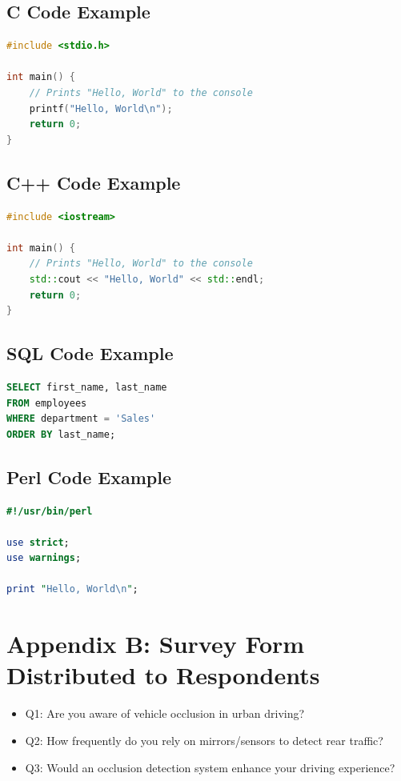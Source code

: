 \documentclass[12pt,a4paper]{report}
\theoremstyle{definition}
\theoremstyle{remark}
\begin{document}
\section{C Code Example}
\begin{lstlisting}[language=C, caption=C Example]
#include <stdio.h>

int main() {
    // Prints "Hello, World" to the console
    printf("Hello, World\n");
    return 0;
}
\end{lstlisting}

\section{C++ Code Example}
\begin{lstlisting}[language=C++, caption=C++ Example]
#include <iostream>

int main() {
    // Prints "Hello, World" to the console
    std::cout << "Hello, World" << std::endl;
    return 0;
}
\end{lstlisting}

\section{SQL Code Example}
\begin{lstlisting}[language=SQL, caption=SQL Example]
SELECT first_name, last_name
FROM employees
WHERE department = 'Sales'
ORDER BY last_name;
\end{lstlisting}

\section{Perl Code Example}
\begin{lstlisting}[language=Perl, caption=Perl Example]
#!/usr/bin/perl

use strict;
use warnings;

print "Hello, World\n";
\end{lstlisting}

\chapter{Appendix B: Survey Form Distributed to Respondents}
\label{appendix:survey}

\begin{itemize}
    \item Q1: Are you aware of vehicle occlusion in urban driving?
    \item Q2: How frequently do you rely on mirrors/sensors to detect rear traffic?
    \item Q3: Would an occlusion detection system enhance your driving experience?
\end{itemize}
\end{document}
